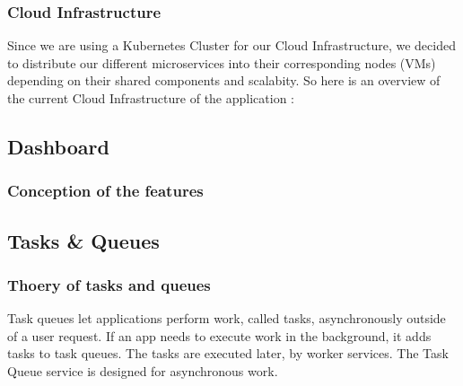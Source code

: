 \subsubsection{Cloud Infrastructure}
Since we are using a Kubernetes Cluster for our Cloud Infrastructure, we decided to distribute our different microservices into their corresponding nodes (VMs) depending on their shared components and scalabity. So here is an overview of the current Cloud Infrastructure of the application :
\linebreak
{}
\subsection{Dashboard}
\subsubsection{Conception of the features}
\newpage
\subsection{Tasks \& Queues}
\subsubsection{Thoery of tasks and queues}
Task queues let applications perform work, called tasks, asynchronously outside of a user request. If an app needs to execute work in the background, it adds tasks to task queues. The tasks are executed later, by worker services. The Task Queue service is designed for asynchronous work.
\linebreak
{}
